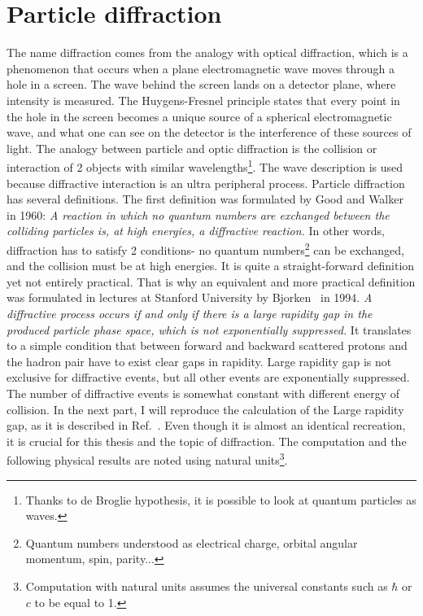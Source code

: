 \section{Particle diffraction}
The name diffraction comes from the analogy with optical diffraction, which is a phenomenon that occurs when a plane electromagnetic wave moves through a hole in a screen. The wave behind the screen lands on a detector plane, where intensity is measured. The Huygens-Fresnel principle states that every point in the hole in 
the screen becomes a unique source of a spherical electromagnetic wave, and what one can see on the detector is the interference of these sources of light. The analogy between particle and optic diffraction is the collision or interaction of 2 objects with similar wavelengths\footnote{Thanks to de Broglie hypothesis, it is possible to look at quantum particles as waves.}. The wave description is used because diffractive interaction is an ultra peripheral process. Particle diffraction has several definitions. The first definition was formulated by Good and Walker~\cite{GoodWalker} in 1960:
\newline
\newline
\textit{A reaction in which no quantum numbers are exchanged between the colliding particles is, at high energies, a diffractive reaction.}
\newline
\newline
In other words, diffraction has to satisfy 2 conditions- no quantum numbers\footnote{Quantum numbers understood as electrical charge, orbital angular momentum, spin, parity...} can be exchanged, and the collision must be at high energies. It is quite a straight-forward definition yet not entirely practical.  That is why an equivalent and more practical definition was formulated in lectures at Stanford University by Bjorken~\cite{Bjorken} in 1994.
\newline
\newline
\textit{A diffractive process occurs if and only if there is a large rapidity gap in the produced particle phase space, which is not exponentially suppressed.}
\newline
\newline
It translates to a simple condition that between forward and backward scattered protons and the hadron pair have to exist clear gaps in rapidity. Large rapidity gap is not exclusive for diffractive events, but all other events are exponentially suppressed. The number of diffractive events is somewhat constant with different energy of collision. In the next part, I will reproduce the calculation of the Large rapidity gap, as it is described in Ref.~\cite{Barone}. Even though it is almost an identical recreation, it is crucial for this thesis and the topic of diffraction. The computation and the following physical results are noted using natural units\footnote{Computation with natural units assumes the universal constants such as $\hbar$ or $c$ to be equal to 1.}.
